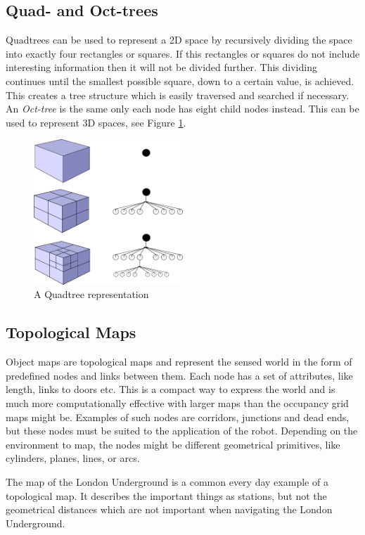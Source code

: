 \subsection{Quad- and Oct-trees}
Quadtrees can be used to represent a 2D space by recursively dividing the space into
exactly four rectangles or squares. If this rectangles or squares do not include
interesting information then it will not be divided further. This dividing continues until
the smallest possible square, down to a certain value, is achieved. This creates a tree structure which is easily
traversed and searched if necessary. An \emph{Oct-tree} is the same only each node has 
eight child nodes instead. This can be used to represent 3D spaces, see Figure
\ref{chap2:fig-octtree}.
\begin{figure}[htbp]
    \centering
   \includegraphics[width=0.5\textwidth]{pics/octtree}
    \caption{A Quadtree representation}
    \label{chap2:fig-octtree}
\end{figure}
\cite{mathisen}


\subsection{Topological Maps}
Object maps are topological maps and represent the sensed world in the form of predefined nodes and links
between them. Each node has a set of attributes, like length, links to doors etc. This is
a compact way to express the world and is much more computationally effective with larger
maps than the occupancy grid maps might be. Examples of such nodes are corridors,
junctions and dead ends, but these nodes must be suited to the application of the robot.
Depending on the environment to map, the nodes might be different geometrical primitives,
like cylinders, planes, lines, or arcs. 

The map of the London Underground is a common every day example of a topological map. It describes
the important things as stations, but not the geometrical distances which are not important
when navigating the London Underground. \cite{thrun}


